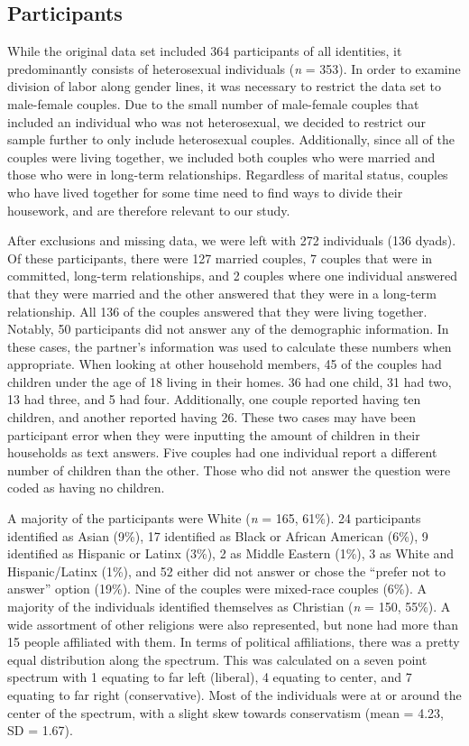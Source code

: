 \documentclass[
  man]{apa6}
\begin{document}
\hypertarget{participants}{%
\subsection{Participants}\label{participants}}

While the original data set included 364 participants of all identities, it predominantly consists of heterosexual individuals (\emph{n} = 353). In order to examine division of labor along gender lines, it was necessary to restrict the data set to male-female couples. Due to the small number of male-female couples that included an individual who was not heterosexual, we decided to restrict our sample further to only include heterosexual couples. Additionally, since all of the couples were living together, we included both couples who were married and those who were in long-term relationships. Regardless of marital status, couples who have lived together for some time need to find ways to divide their housework, and are therefore relevant to our study.

After exclusions and missing data, we were left with 272 individuals (136 dyads). Of these participants, there were 127 married couples, 7 couples that were in committed, long-term relationships, and 2 couples where one individual answered that they were married and the other answered that they were in a long-term relationship. All 136 of the couples answered that they were living together. Notably, 50 participants did not answer any of the demographic information. In these cases, the partner's information was used to calculate these numbers when appropriate. When looking at other household members, 45 of the couples had children under the age of 18 living in their homes. 36 had one child, 31 had two, 13 had three, and 5 had four. Additionally, one couple reported having ten children, and another reported having 26. These two cases may have been participant error when they were inputting the amount of children in their households as text answers. Five couples had one individual report a different number of children than the other. Those who did not answer the question were coded as having no children.

A majority of the participants were White (\emph{n} = 165, 61\%). 24 participants identified as Asian (9\%), 17 identified as Black or African American (6\%), 9 identified as Hispanic or Latinx (3\%), 2 as Middle Eastern (1\%), 3 as White and Hispanic/Latinx (1\%), and 52 either did not answer or chose the ``prefer not to answer'' option (19\%). Nine of the couples were mixed-race couples (6\%). A majority of the individuals identified themselves as Christian (\emph{n} = 150, 55\%). A wide assortment of other religions were also represented, but none had more than 15 people affiliated with them. In terms of political affiliations, there was a pretty equal distribution along the spectrum. This was calculated on a seven point spectrum with 1 equating to far left (liberal), 4 equating to center, and 7 equating to far right (conservative). Most of the individuals were at or around the center of the spectrum, with a slight skew towards conservatism (mean = 4.23, SD = 1.67).
\end{document}
